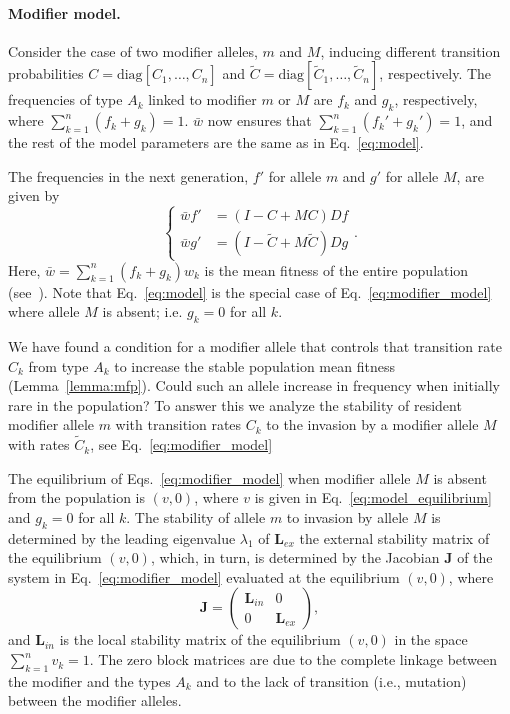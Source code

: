 \documentclass[9pt, a4paper, twocolumn]{extarticle}
\newcommand{\matrx}[1]{{\left[ \stackrel{}{#1}\right]}}
\newcommand{\diag}[1]{\mbox{diag}\matrx{#1}}
\newcommand{\cl}{\mathbf{L}}
\newcommand{\cj}{\mathbf{J}}
\begin{document}
\paragraph*{Modifier model.}
Consider the case of two modifier alleles, $m$ and $M$, inducing different transition probabilities $C=\diag{C_1, \ldots, C_n}$ and $\tilde{C}=\diag{\tilde{C}_1, \ldots, \tilde{C}_n}$, respectively.
The frequencies of type $A_k$ linked to modifier $m$ or $M$ are $f_k$ and $g_k$, respectively, where $\sum_{k=1}^{n}{(f_k + g_k)}=1$.
$\bar{w}$ now ensures that $\sum_{k=1}^{n}{(f_k' + g_k')}=1$, 
and the rest of the model parameters are the same as in Eq.~\ref{eq:model}.

The frequencies in the next generation, $f'$ for allele $m$ and $g'$ for allele $M$, are given by
\begin{equation}
\begin{cases}
\bar{w} f' &= (I-C+MC)D f \\
\bar{w} g' &= (I-\tilde{C}+M\tilde{C})D g
\end{cases}.
\label{eq:modifier_model}
\end{equation}
Here, $\bar{w}=\sum_{k=1}^{n}{(f_k + g_k) w_k}$ is the mean fitness of the entire population (see~). 
Note that Eq.~\ref{eq:model} is the special case of Eq.~\ref{eq:modifier_model} where allele $M$ is absent; i.e. $g_k=0$ for all $k$.


We have found a condition for a modifier allele that controls that transition rate $C_k$ from type $A_k$ to increase the stable population mean fitness (Lemma~\ref{lemma:mfp}).
Could such an allele increase in frequency when initially rare in the population?
To answer this we analyze the stability of resident modifier allele $m$ with transition rates $C_k$ to the invasion by a modifier allele $M$ with rates $\tilde{C}_k$, see Eq.~\ref{eq:modifier_model}~\citep[for an introduction to \emph{evolutionary invasion analysis}, see][ch.~12]{Otto2007}

The equilibrium of Eqs.~\ref{eq:modifier_model} when modifier allele $M$ is absent from the population is $(v, 0)$, where $v$ is given in Eq.~\ref{eq:model_equilibrium} and $g_k=0$ for all $k$. 
The stability of allele $m$ to invasion by allele $M$ is determined by the leading eigenvalue $\lambda_1$ of $\cl_{ex}$ the external stability matrix of the equilibrium $(v,0)$, which, in turn, is determined by the Jacobian $\cj$ of the system in Eq.~\ref{eq:modifier_model} evaluated at the equilibrium $(v,0)$, where
\begin{equation}
\cj = \begin{pmatrix}\cl_{in} & 0 \\ 0 & \cl_{ex} \end{pmatrix},
\end{equation}
and $\cl_{in}$ is the local stability matrix of the equilibrium $(v,0)$ in the space $\sum_{k=1}^n{v_k}=1$.
The zero block matrices are due to the complete linkage between the modifier and the types $A_k$ and to the lack of transition (i.e., mutation) between the modifier alleles.
\end{document}
